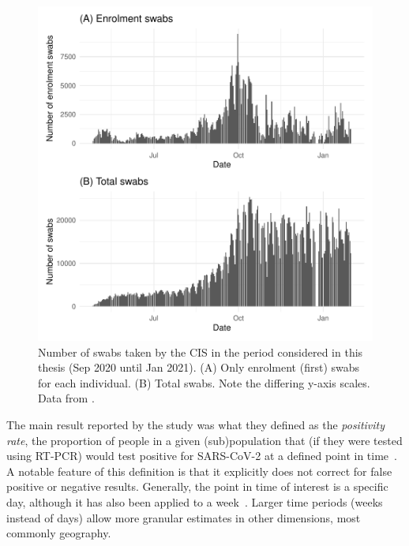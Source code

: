 \documentclass[thesis.tex]{subfiles}
\begin{document}
\begin{figure}
  \centering \includegraphics{biology-data/CIS-recruitment}
  \caption[CIS swab numbers]{%
    Number of swabs taken by the CIS in the period considered in this thesis (Sep 2020 until Jan 2021).
    (A) Only enrolment (\ie first) swabs for each individual.
    (B) Total swabs.
    Note the differing y-axis scales.
    Data from \textcite{CIStechData}.
  }
  \label{biology-data:fig:CIS-recruitment}
\end{figure}


The main result reported by the study was what they defined as the \emph{positivity rate}, the proportion of people in a given (sub)population that (if they were tested using RT-PCR) would test positive for SARS-CoV-2 at a defined point in time~\autocite{cisMethodsONS}.
A notable feature of this definition is that it explicitly does not correct for false positive or negative results.
Generally, the point in time of interest is a specific day, although it has also been applied to a week~\autocite{cisMethodsONS,pouwelsMRPvaccination,pouwelsCommunity}.
Larger time periods (\ie weeks instead of days) allow more granular estimates in other dimensions, most commonly geography.
\end{document}
